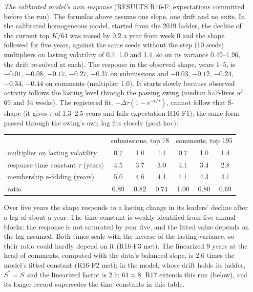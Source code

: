 \documentclass[10pt]{article}
\begin{document}
\emph{The calibrated model's own response} (RESULTS R16-F; expectations committed before the run). The formulas above assume one slope, one drift and no exits. In the calibrated homogeneous model, started from the 2019 ladder, the decline of the current top $K/64$ was raised by 0.2 a year from week 0 and the shape followed for five years, against the same seeds without the step (10 seeds; multipliers on lasting volatility of 0.7, 1.0 and 1.4, so on its variance 0.49--1.96, the drift re-solved at each). The response in the observed shape, years 1--5, is $-0.01$, $-0.08$, $-0.17$, $-0.27$, $-0.37$ on submissions and $-0.03$, $-0.12$, $-0.24$, $-0.34$, $-0.44$ on comments (multiplier 1.0). It starts slowly because observed activity follows the lasting level through the passing swing (median half-lives of 69 and 34 weeks). The registered fit, $-\Delta\tau(1-e^{-t/\tau})$, cannot follow that S-shape (it gives $\tau$ of 1.3--2.5 years and fails expectation R16-F1); the same form passed through the swing's own lag fits closely (post hoc):
\begin{center}\small\begin{tabular}{lccc|ccc}
\toprule
 & \multicolumn{3}{c|}{submissions, top 78} & \multicolumn{3}{c}{comments, top 195}\\
multiplier on lasting volatility & 0.7 & 1.0 & 1.4 & 0.7 & 1.0 & 1.4\\
\midrule
response time constant $\tau$ (years) & 4.5 & 3.7 & 3.0 & 4.1 & 3.4 & 2.8\\
membership e-folding (years) & 5.0 & 4.6 & 4.1 & 4.1 & 4.3 & 4.1\\
ratio & 0.89 & 0.82 & 0.74 & 1.00 & 0.80 & 0.69\\
\bottomrule
\end{tabular}\end{center}
Over five years the shape responds to a lasting change in its leaders' decline after a lag of about a year. The time constant is weakly identified from five annual blocks: the response is not saturated by year five, and the fitted value depends on the lag assumed. Both times scale with the inverse of the lasting variance, so their ratio could hardly depend on it (R16-F3 met). The linearized 9 years at the head of comments, computed with the data's balanced slope, is 2.6 times the model's fitted constant (R16-F2 met); in the model, whose drift holds its ladder, $S^\ast = S$ and the linearized factor is $2\ln 64 \approx 8$. R17 extends this run (below), and its longer record supersedes the time constants in this table.
\end{document}

